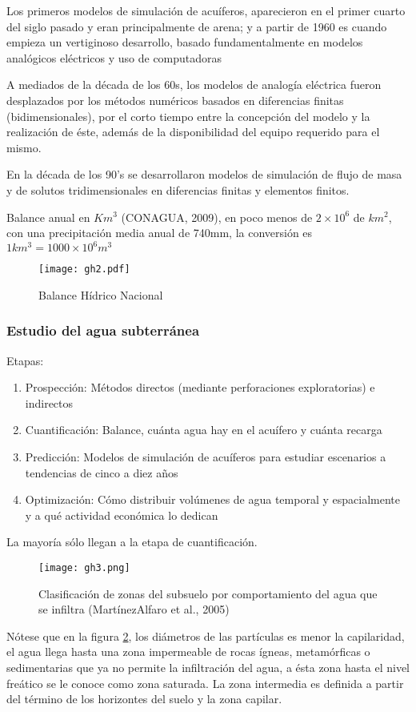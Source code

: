 Los primeros modelos de simulación de acuíferos, aparecieron en el primer cuarto del siglo pasado y eran principalmente de arena; y a partir de 1960 es cuando empieza un vertiginoso desarrollo, basado fundamentalmente en modelos analógicos eléctricos y uso de computadoras

A mediados de la década de los 60s, los modelos de analogía eléctrica fueron desplazados por los métodos numéricos basados en diferencias finitas (bidimensionales), por el corto tiempo entre la concepción del modelo y la realización de éste, además de la disponibilidad del equipo requerido para el mismo.

En la década de los 90's se desarrollaron modelos de simulación de flujo de masa y de solutos tridimensionales en diferencias finitas y elementos finitos.

Balance anual en $Km^3$ (CONAGUA, 2009), en poco menos de $2\times 10^{6}$ de $km^2$, con una precipitación media anual de 740mm, la conversión es $1km^3=1000\times 10^6m^3$
\begin{figure}[h!]
\centering
  \texttt{[image: gh2.pdf]}
  \caption{Balance Hídrico Nacional}
  \label{gh2}
\end{figure}
\subsubsection{Estudio del agua subterránea}
Etapas:
\begin{enumerate}
    \item Prospección: Métodos directos (mediante perforaciones exploratorias) e indirectos
    \item Cuantificación: Balance, cuánta agua hay en el acuífero y cuánta recarga
    \item Predicción: Modelos de simulación de acuíferos para estudiar escenarios a tendencias de cinco a diez años
    \item Optimización: Cómo distribuir volúmenes de agua temporal y espacialmente y a qué actividad económica lo dedican
\end{enumerate}
La mayoría sólo llegan a la etapa de cuantificación.
\begin{figure}[h!]
    \centering
      \texttt{[image: gh3.png]}
      \caption{Clasificación de zonas del subsuelo por comportamiento del agua que se infiltra (MartínezAlfaro et al., 2005)}
      \label{gh3}
    \end{figure}
    Nótese que en la figura \ref{gh3}, los diámetros de las partículas es menor la capilaridad, el agua llega hasta una zona impermeable de rocas ígneas, metamórficas o sedimentarias que ya no permite la infiltración del agua,
    a ésta zona hasta el nivel freático se le conoce como zona saturada. La zona intermedia es definida a partir del término de los horizontes del suelo y la zona capilar.
